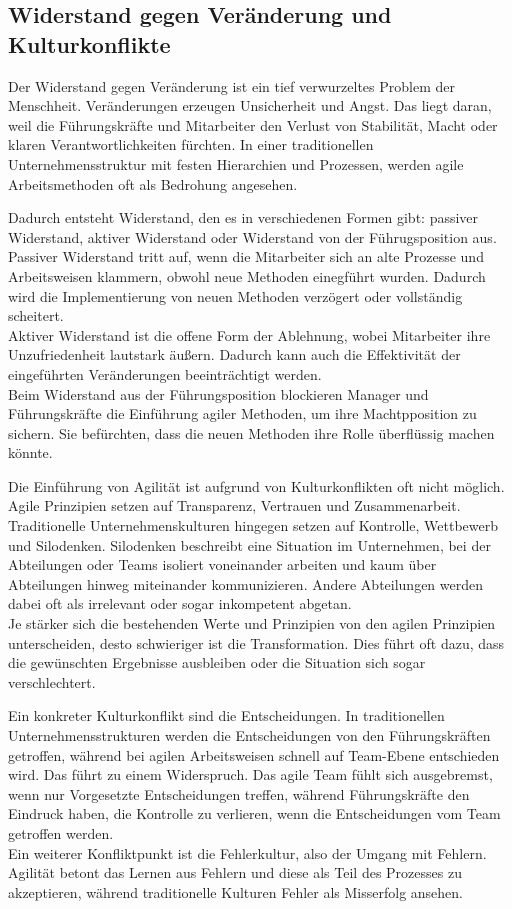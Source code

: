 \documentclass[ngerman]{seminarvorlage}
\begin{document}
\subsection{Widerstand gegen Veränderung und Kulturkonflikte}
Der Widerstand gegen Veränderung ist ein tief verwurzeltes Problem der Menschheit. Veränderungen erzeugen Unsicherheit und Angst. Das liegt daran, weil die Führungskräfte und Mitarbeiter den Verlust von Stabilität, Macht oder klaren Verantwortlichkeiten fürchten. In einer traditionellen Unternehmensstruktur mit festen Hierarchien und Prozessen, werden agile Arbeitsmethoden oft als Bedrohung angesehen.\cite{Frischherz.2024}

Dadurch entsteht Widerstand, den es in verschiedenen Formen gibt: passiver Widerstand, aktiver Widerstand oder Widerstand von der Führugsposition aus.\\ Passiver Widerstand tritt auf, wenn die Mitarbeiter sich an alte Prozesse und Arbeitsweisen klammern, obwohl neue Methoden einegführt wurden. Dadurch wird die Implementierung von neuen Methoden verzögert oder vollständig scheitert.\\ Aktiver Widerstand ist die offene Form der Ablehnung, wobei Mitarbeiter ihre Unzufriedenheit lautstark äußern. Dadurch kann auch die Effektivität der eingeführten Veränderungen beeinträchtigt werden. \\Beim Widerstand aus der Führungsposition blockieren Manager und Führungskräfte die Einführung agiler Methoden, um ihre Machtpposition zu sichern. Sie befürchten, dass die neuen Methoden ihre Rolle überflüssig machen könnte.

Die Einführung von Agilität ist aufgrund von Kulturkonflikten oft nicht möglich. Agile Prinzipien setzen auf Transparenz, Vertrauen und Zusammenarbeit. Traditionelle Unternehmenskulturen hingegen setzen auf Kontrolle, Wettbewerb und Silodenken. Silodenken beschreibt eine Situation im Unternehmen, bei der Abteilungen oder Teams isoliert voneinander arbeiten und kaum über Abteilungen hinweg miteinander kommunizieren. Andere Abteilungen werden dabei oft als irrelevant oder sogar inkompetent abgetan.\\ Je stärker sich die bestehenden Werte und Prinzipien von den agilen Prinzipien unterscheiden, desto schwieriger ist die Transformation. Dies führt oft dazu, dass die gewünschten Ergebnisse ausbleiben oder die Situation sich sogar verschlechtert.\cite{Natsiopoulou.,tractionwise.2023}

Ein konkreter Kulturkonflikt sind die Entscheidungen. In traditionellen Unternehmensstrukturen werden die Entscheidungen von den Führungskräften getroffen, während bei agilen Arbeitsweisen schnell auf Team-Ebene entschieden wird. Das führt zu einem Widerspruch. Das agile Team fühlt sich ausgebremst, wenn nur Vorgesetzte Entscheidungen treffen, während Führungskräfte den Eindruck haben, die Kontrolle zu verlieren, wenn die Entscheidungen vom Team getroffen werden.\\
Ein weiterer Konfliktpunkt ist die Fehlerkultur, also der Umgang mit Fehlern. Agilität betont das Lernen aus Fehlern und diese als Teil des Prozesses zu akzeptieren, während traditionelle Kulturen Fehler als Misserfolg ansehen.\cite{wavestone.2024}
\end{document}
